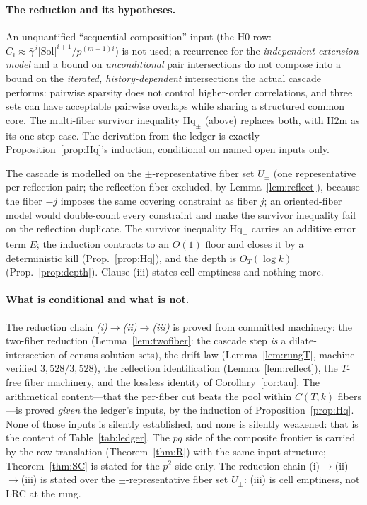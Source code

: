 \documentclass[11pt,a4paper]{article}
\numberwithin{equation}{section}
\theoremstyle{plain}
\theoremstyle{definition}
\theoremstyle{remark}
\begin{document}
\paragraph{The reduction and its hypotheses.}
An unquantified ``sequential composition'' input
(the $\mathrm{H0}$ row: $C_i\approx
\bar\gamma^{\,i}|\mathrm{Sol}|^{i+1}/p^{(m-1)i}$) is not used; a recurrence for the
\emph{independent-extension model} and a bound on \emph{unconditional} pair
intersections do not compose into a bound on the \emph{iterated,
history-dependent} intersections the actual cascade performs: pairwise
sparsity does not control higher-order correlations, and three sets can have
acceptable pairwise overlaps while sharing a structured common core. The
multi-fiber survivor inequality $\mathrm{Hq}_\pm$ (above) replaces both, with
$\mathrm{H2m}$ as its one-step case. The derivation from the ledger is
exactly Proposition~\ref{prop:Hq}'s induction, conditional on named open
inputs only.

The cascade is modelled on the $\pm$-representative fiber set $U_\pm$
(one representative per reflection pair; the reflection fiber excluded, by
Lemma~\ref{lem:reflect}), because the fiber $-j$ imposes the same covering
constraint as fiber $j$; an oriented-fiber model would double-count every
constraint and make the survivor inequality fail on the reflection duplicate.
The survivor inequality $\mathrm{Hq}_\pm$ carries an additive error term $E$;
the induction contracts to an $O(1)$ floor and closes it by a deterministic
kill (Prop.~\ref{prop:Hq}), and the depth is $O_T(\log k)$
(Prop.~\ref{prop:depth}). Clause (iii) states cell emptiness and nothing more.

\paragraph{What is conditional and what is not.}
The reduction chain \emph{(i)}$\to$\emph{(ii)}$\to$\emph{(iii)} is
proved from committed machinery: the two-fiber reduction
(Lemma~\ref{lem:twofiber}: the cascade step \emph{is} a
dilate-intersection of census solution sets), the drift law
(Lemma~\ref{lem:rungT}, machine-verified $3{,}528/3{,}528$), the
reflection identification (Lemma~\ref{lem:reflect}), the
$T$-free fiber machinery, and the lossless identity of
Corollary~\ref{cor:tau}. The arithmetical content---that the per-fiber
cut beats the pool within $C(T,k)$ fibers---is proved \emph{given} the
ledger's inputs, by the induction of Proposition~\ref{prop:Hq}. None of those inputs is silently established, and none
is silently weakened: that is the content of Table~\ref{tab:ledger}. The
$pq$ side of the composite frontier is carried by the row translation
(Theorem~\ref{thm:R}) with the same input structure; Theorem~\ref{thm:SC}
is stated for the $p^2$ side only. The reduction chain (i)$\to$(ii)$\to$(iii) is stated
over the $\pm$-representative fiber set $U_\pm$: (iii) is cell emptiness,
not LRC at the rung.
\end{document}
